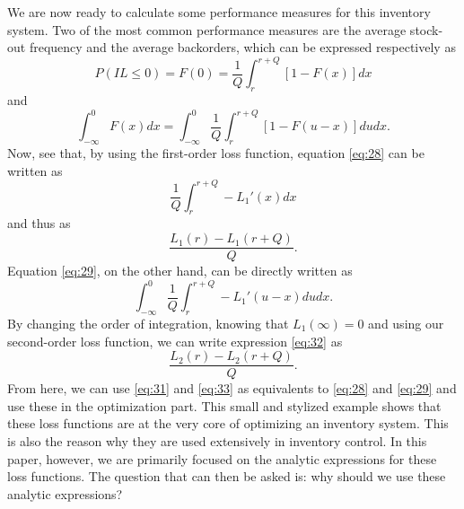 \documentclass{article}
\begin{document}
\begin{flushleft}
    We are now ready to calculate some performance measures for this inventory system.
    Two of the most common performance measures are the average stock-out frequency and the average backorders, which can be expressed respectively as
    \begin{equation} \label{eq:28}
        P(IL \le 0) = F(0) = \frac{1}{Q}\int_r^{r+Q}\left[1-F(x)\right] dx
    \end{equation}
    and
    \begin{equation} \label{eq:29}
        \int_{-\infty}^0 F(x) dx = \int_{-\infty}^0 \frac{1}{Q}\int_r^{r+Q}\left[1-F(u-x)\right] dudx.
    \end{equation}
    Now, see that, by using the first-order loss function, equation \ref{eq:28} can be written as
    \begin{equation}
        \frac{1}{Q}\int_r^{r+Q}-L_1'(x) dx
    \end{equation}
    and thus as
    \begin{equation} \label{eq:31}
        \frac{L_1(r)-L_1(r+Q)}{Q}.
    \end{equation}
    Equation \ref{eq:29}, on the other hand, can be directly written as
    \begin{equation} \label{eq:32}
        \int_{-\infty}^0 \frac{1}{Q}\int_r^{r+Q}-L_1'(u-x) dudx.
    \end{equation}
    By changing the order of integration, knowing that $L_1(\infty) = 0$ and using our second-order loss function, we can write expression \ref{eq:32} as
    \begin{equation} \label{eq:33}
        \frac{L_2(r)-L_2(r+Q)}{Q}.
    \end{equation}
    From here, we can use \ref{eq:31} and \ref{eq:33} as equivalents to \ref{eq:28} and \ref{eq:29} and use these in the optimization part.
    This small and stylized example shows that these loss functions are at the very core of optimizing an inventory system.
    This is also the reason why they are used extensively in inventory control.
    In this paper, however, we are primarily focused on the analytic expressions for these loss functions.
    The question that can then be asked is: why should we use these analytic expressions?
\end{flushleft}
\end{document}
